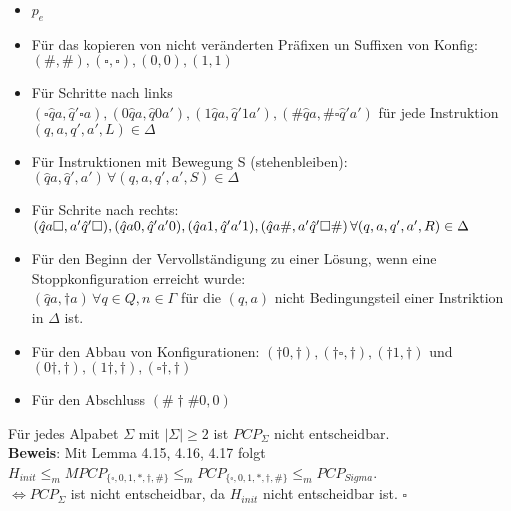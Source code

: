\begin{lemma}{}
    
    \begin{itemize}
        \item $p_e$
        \item Für das kopieren von nicht veränderten Präfixen un Suffixen von Konfig: $(\#,\#),(\square,\square),(0,0),(1,1)$
        \item Für Schritte nach links $(\square \hat{q} a, \hat{q}' \square a), (0\hat{q} a, \hat{q} 0 a'), (1 \hat{q} a, \hat{q}' 1 a'), (\# \hat{q} a, \# \square \hat{q}'a')$
              für jede Instruktion $(q,a,q',a',L) \in \Delta$
        \item Für Instruktionen mit Bewegung S (stehenbleiben): $(\hat{q} a, \hat{q}',a') \, \forall (q,a,q',a',S) \in \Delta $
        \item Für Schrite nach rechts: $(\hat{q} a \square, a' \hat{q}' \square),(\hat{q} a 0, \hat{q}' a'0),(\hat{q} a 1, \hat{q}' a' 1), \\
        (\hat{q} a \#, a' \hat{q}' \square \#) \, \forall (q,a,q',a',R) \in \Delta$
        \item Für den Beginn der Vervollständigung zu einer Lösung, wenn eine Stoppkonfiguration erreicht wurde: \\
              $(\hat{q} a, \dagger a) \, \forall q \in Q, n \in \Gamma$ für die $(q,a)$ nicht Bedingungsteil einer Instriktion in $\Delta$ ist.
        \item Für den Abbau von Konfigurationen: $(\dagger 0, \dagger),(\dagger \square, \dagger),(\dagger1,\dagger)$ und $(0\dagger,\dagger),
              (1 \dagger,\dagger),(\square \dagger,\dagger)$
        \item Für den Abschluss $(\#\dagger\#0,0)$
    \end{itemize}

\end{lemma}

\begin{satz}{}
    Für jedes Alpabet $\Sigma$ mit $\vert \Sigma \vert \geq 2$ ist $PCP_\Sigma$ nicht entscheidbar. \\
    \textbf{Beweis}: Mit Lemma 4.15, 4.16, 4.17 folgt $H_{init} \leq_m MPCP_{\{\square, 0,1,*,\dagger,\#\}} \leq_m PCP_{\{\square,0,1,*,\dagger,\#\}}
    \leq_m PCP_{Sigma}$.\\
    $\Leftrightarrow PCP_\Sigma$ ist nicht entscheidbar, da $H_{init}$ nicht entscheidbar ist. $\square$
\end{satz}